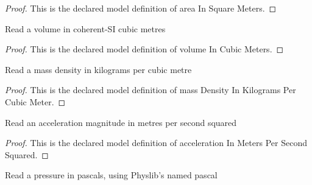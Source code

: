 \begin{proof}
  This is the declared model definition of area In Square Meters.
\end{proof}
\begin{definition}
  \label{def:physics:phyx-mini-0389:phyxminiproblems-problemphyxmini0389-volumeincubicmeters}
  Read a volume in coherent-SI cubic metres
\end{definition}
\begin{proof}
  This is the declared model definition of volume In Cubic Meters.
\end{proof}
\begin{definition}
  \label{def:physics:phyx-mini-0389:phyxminiproblems-problemphyxmini0389-massdensityinkilogramspercubicmeter}
  Read a mass density in kilograms per cubic metre
\end{definition}
\begin{proof}
  This is the declared model definition of mass Density In Kilograms Per Cubic Meter.
\end{proof}
\begin{definition}
  \label{def:physics:phyx-mini-0389:phyxminiproblems-problemphyxmini0389-accelerationinmeterspersecondsquared}
  Read an acceleration magnitude in metres per second squared
\end{definition}
\begin{proof}
  This is the declared model definition of acceleration In Meters Per Second Squared.
\end{proof}
\begin{definition}
  \label{def:physics:phyx-mini-0389:phyxminiproblems-problemphyxmini0389-pressureinpascals}
  Read a pressure in pascals, using Physlib's named pascal
\end{definition}
